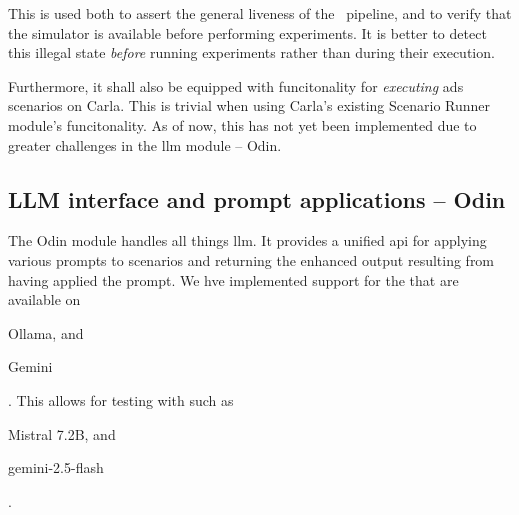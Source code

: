 

This is used both to assert the general liveness of the \hefe~pipeline, and to
verify that the simulator is available before performing experiments. It is
better to detect this illegal state \emph{before} running experiments rather
than during their execution.

Furthermore, it shall also be equipped with funcitonality for \emph{executing} \acrshort{ads}
scenarios on Carla. This is trivial when using Carla's existing Scenario Runner
module's funcitonality. As of now, this has not yet been implemented due to
greater challenges in the \acrshort{llm} module -- Odin.



\subsection{LLM interface and prompt applications -- Odin}\label{sec:odinImplementation}


The Odin module handles all things \acrshort{llm}. It provides a unified
\acrshort{api} for applying various prompts to scenarios and returning the
enhanced output resulting from having applied the prompt. We hve implemented
support for the  that are available on \begin{inparaenum}
    \item Ollama, and
    \item Gemini
\end{inparaenum}. This allows for testing with  such as
\begin{inparaenum}\setcounter{enumi}{2}
    \item Mistral \num{7.2}B, and
    \item gemini-2.5-flash
\end{inparaenum}.

